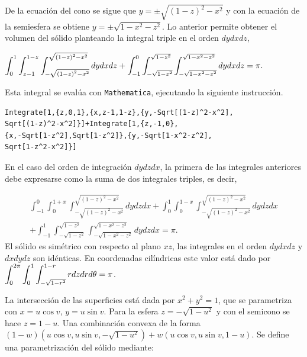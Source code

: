 De la ecuación del cono se sigue que
{\small $y=\pm \sqrt{\left( 1-z\right) ^2-x^2}$} y con la ecuación de la semiesfera se obtiene {\small $y=\pm \sqrt{1-x^2-z^2}$.} Lo anterior permite obtener el volumen del sólido planteando la integral triple en el orden $dydxdz$,

$\displaystyle \int_{0}^{1}\int_{z-1}^{1-z}\int_{-\sqrt{\left( 1-z\right)^2-x^2}}^{\sqrt{\left( 1-z\right) ^2-x^2}}dydxdz+\int_{-1}^{0}\int_{-\sqrt{1-z^2}}^{\sqrt{1-z^2}}\int_{-\sqrt{1-x^2-z^2}}^{\sqrt{1-x^2-z^2}}dydxdz=\pi. $

Esta integral se evalúa con \verb"Mathematica", ejecutando la siguiente instrucción.

\begin{tcolorbox}[title=\bf Instrucción en \verb"Mathematica"]\begin{Verbatim}[formatcom=\letraverbatim]
Integrate[1,{z,0,1},{x,z-1,1-z},{y,-Sqrt[(1-z)^2-x^2],
Sqrt[(1-z)^2-x^2]}]+Integrate[1,{z,-1,0},
{x,-Sqrt[1-z^2],Sqrt[1-z^2]},{y,-Sqrt[1-x^2-z^2],
Sqrt[1-z^2-x^2]}]
\end{Verbatim}
\end{tcolorbox}

En el caso del orden de integración $dydzdx$, la primera de las integrales anteriores debe expresarse como la suma de dos integrales triples, es decir,

{\small
\begin{multline*}
\int_{-1}^{0}\int_{0}^{1+x}\int_{-\sqrt{(1-z)^2-x^2}}^{\sqrt{(1-z)^2-x^2}}dydzdx+\int_{0}^{1}\int_{0}^{1-x}\int_{-\sqrt{\left( 1-z\right) ^2-x^2}}^{\sqrt{\left( 1-z\right) ^2-x^2}}dydzdx\\
+\int_{-1}^{1}\int_{-\sqrt{1-z^2}}^{\sqrt{1-z^2}}\int_{-\sqrt{1-x^2-z^2}}^{\sqrt{1-x^2-z^2}}dydzdx = \pi.
\end{multline*}
}
El sólido es simétrico con respecto al plano $xz$, las integrales en el orden $dydxdz$ y $dxdydz$ son idénticas.
En coordenadas cilíndricas este valor está dado por
{\small$\displaystyle \int_{0}^{2\pi }\int_{0}^{1}\int_{-\sqrt{1-r^2}}^{1-r}rdzdrd\theta = \pi$.}

La intersección de las superficies está dada por
$x^2+y^2=1$, que se parametriza con
$x= u\cos v$, $y=u\sin v$. Para la esfera $z= -\sqrt{1-u^2}$
y con el semicono se hace $z=1-u$. Una combinación convexa de la forma
$\left( 1-w\right) \left( u\cos v,u\sin v,-\sqrt{1-u^2}\right) +w\left(u\cos v,u\sin v,1-u\right)$.
Se define una parametrización del sólido mediante:


